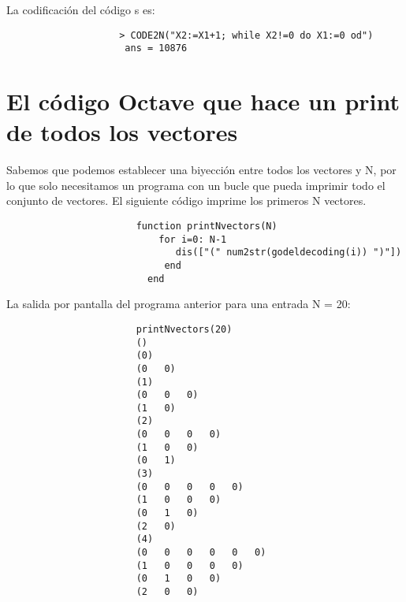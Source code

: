 \documentclass{article}
\begin{document}
La codificación del código s es:\\

\begin{verbatim}
                    > CODE2N("X2:=X1+1; while X2!=0 do X1:=0 od")
                     ans = 10876
\end{verbatim}





\newpage
\section{El código Octave que hace un print de todos los vectores}
Sabemos que podemos establecer una biyección entre todos los vectores y N, por lo que solo necesitamos un programa con un bucle que pueda imprimir todo el conjunto de vectores. El siguiente código imprime los primeros N vectores.
\vspace{1cm}

\begin{verbatim}
                       function printNvectors(N)
                           for i=0: N-1
                              dis(["(" num2str(godeldecoding(i)) ")"])
                            end
                         end
\end{verbatim}
                              





La salida por pantalla del programa anterior para una entrada N = 20:

\begin{verbatim}
                       printNvectors(20)
                       ()
                       (0)
                       (0   0)
                       (1)
                       (0   0   0)
                       (1   0)
                       (2)
                       (0   0   0   0)
                       (1   0   0)
                       (0   1)
                       (3)
                       (0   0   0   0   0)
                       (1   0   0   0)
                       (0   1   0)
                       (2   0)
                       (4)
                       (0   0   0   0   0   0)
                       (1   0   0   0   0)
                       (0   1   0   0)
                       (2   0   0)
                    
\end{verbatim}
\end{document}
